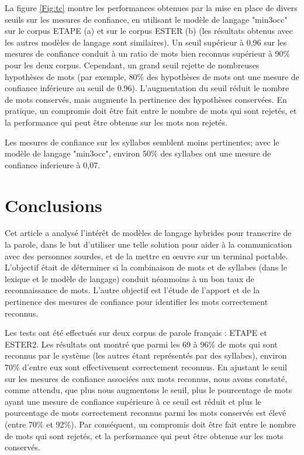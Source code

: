 \documentclass[10pt,a4paper,twoside]{article}
\begin{document}
La figure \ref{Fig:tc} montre les performances obtenues par la mise en place de divers seuils sur les mesures de confiance, en utilisant le modèle de langage "min3occ" sur le corpus ETAPE (a) et sur le corpus ESTER (b) (les résultats obtenus avec les autres modèles de langage sont similaires). 
Un seuil supérieur à 0,96 sur les mesures de confiance conduit à un ratio de mots bien reconnus supérieur à 90\% pour les deux corpus. 
Cependant, un grand seuil rejette de nombreuses hypothèses de mots (par exemple, 80\% des hypothèses de mots ont une mesure de confiance inférieure au seuil de 0.96).
L’augmentation du seuil réduit le nombre de mots conservés, mais augmente la pertinence des hypothèses conservées. 
En pratique, un compromis doit être fait entre le nombre de mots qui sont rejetés, et la performance qui peut être obtenue sur les mots non rejetés. 

Les mesures de confiance sur les syllabes semblent moins pertinentes; avec le modèle de langage "min3occ", environ 50\% des syllabes ont une mesure de confiance inferieure à 0,07.


\section{Conclusions}

Cet article a analysé l'intérêt de modèles de langage hybrides pour transcrire de la parole, dans le but d'utiliser une telle solution pour aider à la communication avec des personnes sourdes, et de la mettre en œuvre sur un terminal portable.
L'objectif était de déterminer si la combinaison de mots et de syllabes (dans le lexique et le modèle de langage) conduit néanmoins à un bon taux de reconnaissance de mots. L'autre objectif est l'étude de l'apport et de la pertinence des mesures de confiance pour identifier les mots correctement reconnus.

Les tests ont été effectués sur deux corpus de parole français : ETAPE et ESTER2. 
Les résultats ont montré que parmi les 69 à 96\% de mots qui sont reconnus par le système (les autres étant représentés par des syllabes), environ 70\% d'entre eux sont effectivement correctement reconnus. 
En ajustant le seuil sur les mesures de confiance associées aux mots reconnus, nous avons constaté, comme attendu, que plus nous augmentons le seuil, plus le pourcentage de mots ayant une mesure de confiance supérieure à ce seuil est réduit et plus le pourcentage de mots correctement reconnus parmi les mots conservés est élevé (entre 70\% et 92\%). 
Par conséquent, un compromis doit être fait entre le nombre de mots qui sont rejetés, et la performance qui peut être obtenue sur les mots conservés.
\end{document}
